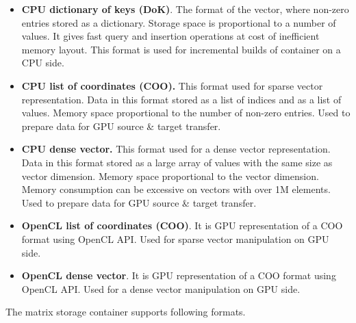 \begin{itemize}
    \item \textbf{CPU dictionary of keys (DoK)}. The format of the vector, where non-zero entries stored as a dictionary. Storage space is proportional to a number of values. It gives fast query and insertion operations at cost of inefficient memory layout. This format is used for incremental builds of container on a CPU side.
    \item \textbf{CPU list of coordinates (COO).} This format used for sparse vector representation. Data in this format stored as a list of indices and as a list of values. Memory space proportional to the number of non-zero entries. Used to prepare data for GPU source \& target transfer.
    \item \textbf{CPU dense vector.} This format used for a dense vector representation. Data in this format stored as a large array of values with the same size as vector dimension. Memory space proportional to the vector dimension. Memory consumption can be excessive on vectors with over 1M elements. Used to prepare data for GPU source \& target transfer.
    \item \textbf{OpenCL list of coordinates (COO)}. It is GPU representation of a COO format using OpenCL API. Used for sparse vector manipulation on GPU side. 
    \item \textbf{OpenCL dense vector}. It is GPU representation of a COO format using OpenCL API. Used for a dense vector manipulation on GPU side.
\end{itemize}

The matrix storage container supports following formats.

